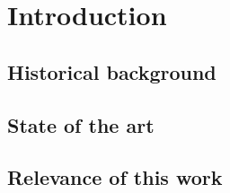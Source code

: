 \chapter{Introduction}\label{chap:intro}
\minitoc
\section{Historical background}
\section{State of the art}
\section{Relevance of this work}
 